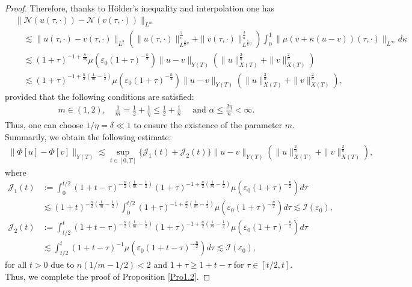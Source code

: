 \documentclass[11pt,reqno]{amsart}
\begin{document}
\begin{proof}
   Therefore,  thanks to H\"older's inequality and interpolation  one has
    \begin{align*}
        &\|\mathcal{N}(u(\tau,\cdot))-\mathcal{N}(v(\tau,\cdot))\|_{L^m} \\
        &\quad
        \lesssim \|u(\tau,\cdot)-v(\tau,\cdot)\|_{L^2} \left(\|u(\tau,\cdot)\|_{L^{\frac{2}{n} \eta}}^{\frac{2}{n}} + \|v(\tau,\cdot)\|_{L^{\frac{2}{n}\eta}}^{\frac{2}{n}}\right) \int_0^1 \|\mu(v+\kappa(u-v))(\tau,\cdot)\|_{L^\infty} d\kappa \\
        &\quad\lesssim (1+\tau)^{-1+\frac{n}{2\eta}} \mu\left(\varepsilon_0 (1+\tau)^{-\frac{n}{2}}\right) \|u-v\|_{Y(T)} \left(\|u\|_{X(T)}^{\frac{2}{n}}+\|v\|_{X(T)}^{\frac{2}{n}}\right)\\
        &\quad\lesssim (1+\tau)^{-1+\frac{n}{2}(\frac{1}{m}-\frac{1}{2})} \mu\left(\varepsilon_0 (1+\tau)^{-\frac{n}{2}}\right) \|u-v\|_{Y(T)}\left(\|u\|_{X(T)}^{\frac{2}{n}} + \|v\|_{X(T)}^{\frac{2}{n}}\right),
    \end{align*}
    provided that the following conditions are satisfied:
    \begin{align*}
     m \in (1,2),\quad  \frac{1}{m}=\frac{1}{2}+\frac{1}{\eta} \leq \frac{1}{2}+\frac{1}{n} \quad\text{ and } \alpha \leq \frac{2\eta}{n} < \infty.
    \end{align*}
    Thus, one can choose $1/ \eta =\delta \ll 1$ to ensure the existence of the parameter $m$.
    Summarily, we obtain the following estimate:
    \begin{align*}
        \|\Phi[u]-\Phi[v]\|_{Y(T)} \lesssim \sup_{t \in [0,T]} \big\{\mathcal{J}_1(t) +\mathcal{J}_2(t)\big\} \|u-v\|_{Y(T)}\left(\|u\|_{X(T)}^{\frac{2}{n}} + \|v\|_{X(T)}^{\frac{2}{n
        }}\right),
    \end{align*}
    where 
    \begin{align*}
        \mathcal{J}_1(t) &:=  \int_0^{t/2} (1+t-\tau)^{-\frac{n}{2}(\frac{1}{m}-\frac{1}{2})}(1+\tau)^{-1+\frac{n}{2}(\frac{1}{m}-\frac{1}{2})} \mu\left(\varepsilon_0 (1+\tau)^{-\frac{n}{2}}\right) d\tau\\
         &\lesssim (1+t)^{-\frac{n}{2}(\frac{1}{m}-\frac{1}{2})} \int_0^{t/2} (1+\tau)^{-1+\frac{n}{2}(\frac{1}{m}-\frac{1}{2})} \mu\left(\varepsilon_0 (1+\tau)^{-\frac{n}{2}}\right) d\tau \lesssim \mathcal{I}(\varepsilon_0),\\
         \mathcal{J}_2(t) &:= \int_{t/2}^t (1+t-\tau)^{-\frac{n}{2}(\frac{1}{m}-\frac{1}{2})}(1+\tau)^{-1+\frac{n}{2}(\frac{1}{m}-\frac{1}{2})} \mu\left(\varepsilon_0 (1+\tau)^{-\frac{n}{2}}\right) d\tau \\
         &\lesssim \int_{t/2}^{t} (1+t-\tau)^{-1} \mu\left(\varepsilon_0 (1+t-\tau)^{-\frac{n}{2}}\right) d\tau \lesssim \mathcal{I}(\varepsilon_0),
    \end{align*}
    for all $t > 0$ due to $n\left(1/m-1/2\right) < 2$ and $1 +\tau \geq 1+t-\tau$ for $\tau \in [t/2, t]$.
    Thus, we complete the proof of Proposition \ref{Pro1.2}.
 \end{proof}
\end{document}
